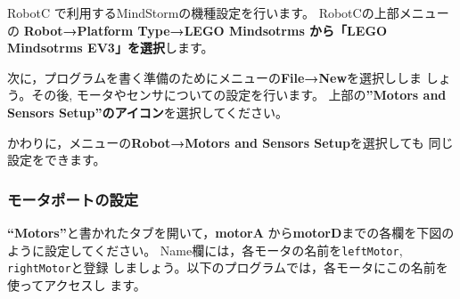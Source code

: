 \documentclass[11pt]{jsarticle}
\begin{document}
RobotC で利用するMindStormの機種設定を行います。
RobotCの上部メニューの
\textbf{Robot→Platform Type→LEGO Mindsotrms から「LEGO Mindsotrms EV3」を選択}します。
\begin{center}
    \centering
\end{center}

次に，プログラムを書く準備のためにメニューの\textbf{File→New}を選択ししま
しょう。その後, モータやセンサについての設定を行います。
上部の\textbf{''Motors and Sensors Setup''のアイコン}を選択してください。
\begin{center}
    \centering
\end{center}
かわりに，メニューの\textbf{Robot→Motors and Sensors Setup}を選択しても
同じ設定をできます。

\subsubsection{モータポートの設定\label{sec:motorport}}

\textbf{``Motors''}と書かれたタブを開いて，\textbf{motorA}
から\textbf{motorD}までの各欄を下図のように設定してください。
Name欄には，各モータの名前を\verb|leftMotor|, \verb|rightMotor|と登録
しましょう。以下のプログラムでは，各モータにこの名前を使ってアクセスし
ます。
\begin{center}
    \centering
\end{center}
\end{document}

